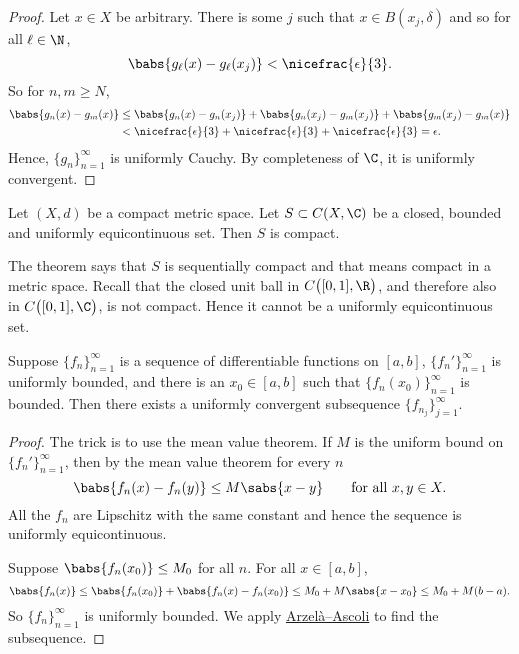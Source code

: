 \begin{proof}
Let $x \in X$ be arbitrary.  There is some $j$ such that
$x \in B(x_j,\delta)$ and so for all $\ell \in \N$,
\begin{equation*}
\babs{g_\ell(x)-g_\ell(x_j)} < \nicefrac{\epsilon}{3}.
\end{equation*}
So for $n,m \geq N$,
\begin{equation*}
\begin{split}
\babs{g_n(x)-g_m(x)} & \leq
\babs{g_n(x)-g_n(x_j)} +
\babs{g_n(x_j)-g_m(x_j)} +
\babs{g_m(x_j)-g_m(x)}
\\
& <
\nicefrac{\epsilon}{3} +
\nicefrac{\epsilon}{3} +
\nicefrac{\epsilon}{3} = \epsilon .
\end{split}
\end{equation*}
Hence, $\{ g_n \}_{n=1}^\infty$ is uniformly Cauchy.  By completeness of $\C$,
it is uniformly convergent.
\end{proof}

\begin{cor}
Let $(X,d)$ be a compact metric space.
Let $S \subset C(X,\C)$ be a closed, bounded and uniformly equicontinuous set.
Then $S$ is compact.
\end{cor}

The theorem says that $S$
is sequentially compact and that means
compact in a metric space.
Recall that the closed unit ball in $C\bigl([0,1],\R\bigr)$, and therefore also in
$C\bigl([0,1],\C\bigr)$, is not compact.
Hence it cannot be a uniformly equicontinuous set.

\begin{cor}
Suppose $\{ f_n \}_{n=1}^\infty$ is a sequence of differentiable functions on $[a,b]$,
$\{ f_n' \}_{n=1}^\infty$ is uniformly bounded, and there is an
$x_0 \in [a,b]$ such that $\{ f_n(x_0) \}_{n=1}^\infty$ is bounded.
Then there exists a uniformly convergent
subsequence $\{ f_{n_j} \}_{j=1}^\infty$.
\end{cor}

\begin{proof}
The trick is to use the mean value theorem.  If $M$ is the uniform bound on
$\{ f_n' \}_{n=1}^\infty$, then by the mean value theorem for every $n$
\begin{equation*}
\babs{f_n(x)-f_n(y)} \leq M \sabs{x-y} \qquad \text{for all } x,y \in X.
\end{equation*}
All the $f_n$ are Lipschitz with the same constant and hence
the sequence is
uniformly equicontinuous.

Suppose $\babs{f_n(x_0)} \leq M_0$ for all $n$.
For all $x \in [a,b]$,
\begin{equation*}
\babs{f_n(x)} \leq \babs{f_n(x_0)}+ \babs{f_n(x)-f_n(x_0)} \leq M_0+ M \sabs{x-x_0}
\leq M_0 + M(b-a) .
\end{equation*}
So $\{ f_n \}_{n=1}^\infty$ is uniformly bounded.
We apply \hyperref[thm:arzelaascoli]{Arzel\`a--Ascoli} to find the subsequence.
\end{proof}

